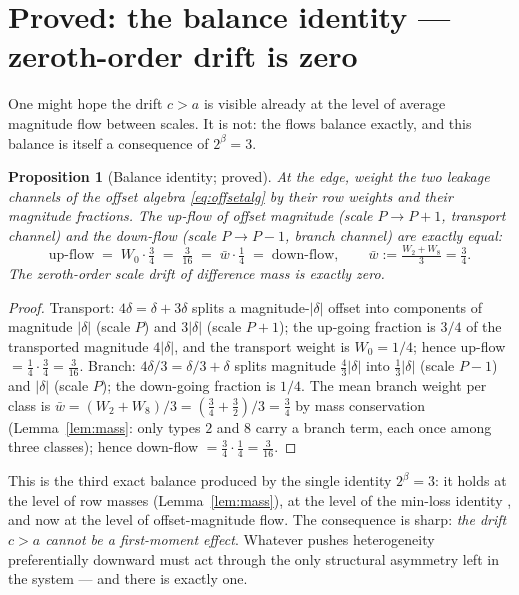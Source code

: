 \documentclass[11pt]{article}
\newtheorem{proposition}[theorem]{Proposition}
\theoremstyle{definition}
\theoremstyle{remark}
\newcommand{\bet}{\beta}
\begin{document}
\section{Proved: the balance identity --- zeroth-order drift is zero}
\label{sec:balance}

One might hope the drift $c > a$ is visible already at the level of
average magnitude flow between scales. It is not: the flows balance
exactly, and this balance is itself a consequence of $2^{\bet} = 3$.

\begin{proposition}[Balance identity; proved]\label{prop:balance}
At the edge, weight the two leakage channels of the offset algebra
\eqref{eq:offsetalg} by their row weights and their magnitude fractions.
The up-flow of offset magnitude (scale $P \to P+1$, transport channel) and
the down-flow (scale $P \to P-1$, branch channel) are exactly equal:
\[
\text{up-flow}
\;=\; W_0 \cdot \tfrac34
\;=\; \tfrac{3}{16}
\;=\; \bar w \cdot \tfrac14
\;=\; \text{down-flow},
\qquad \bar w := \tfrac{W_2 + W_8}{3} = \tfrac34 .
\]
The zeroth-order scale drift of difference mass is exactly zero.
\end{proposition}

\begin{proof}
Transport: $4\delta = \delta + 3\delta$ splits a magnitude-$|\delta|$
offset into components of magnitude $|\delta|$ (scale $P$) and $3|\delta|$
(scale $P+1$); the up-going fraction is $3/4$ of the transported magnitude
$4|\delta|$, and the transport weight is $W_0 = 1/4$; hence up-flow
$= \tfrac14 \cdot \tfrac34 = \tfrac{3}{16}$. Branch:
$4\delta/3 = \delta/3 + \delta$ splits magnitude $\tfrac43 |\delta|$ into
$\tfrac13|\delta|$ (scale $P-1$) and $|\delta|$ (scale $P$); the down-going
fraction is $1/4$. The mean branch weight per class is
$\bar w = (W_2 + W_8)/3 = (\tfrac34 + \tfrac32)/3 = \tfrac34$ by mass
conservation (Lemma~\ref{lem:mass}: only types $2$ and $8$ carry a branch
term, each once among three classes); hence down-flow
$= \tfrac34 \cdot \tfrac14 = \tfrac{3}{16}$.
\end{proof}

This is the third exact balance produced by the single identity
$2^{\bet} = 3$: it holds at the level of row masses
(Lemma~\ref{lem:mass}), at the level of the min-loss identity
\cite{Temp26}, and now at the level of offset-magnitude flow. The
consequence is sharp: \emph{the drift $c > a$ cannot be a first-moment
effect}. Whatever pushes heterogeneity preferentially downward must act
through the only structural asymmetry left in the system --- and there is
exactly one.
\end{document}
